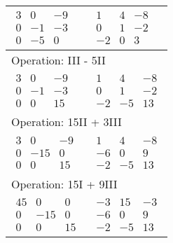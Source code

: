 \begin{longtable}{p{4cm}|p{3cm}}
    $\displaystyle\begin{matrix}
        3 & 0 & -9 \\
        0 & -1 & -3\\
        0 & -5 & 0
    \end{matrix}$&
    $\displaystyle\begin{matrix}
        1 & 4 & -8 \\
        0 & 1 & -2 \\
        -2 & 0 & 3
    \end{matrix}$\\\hline
    \multicolumn{2}{p{\dimexpr4cm+3cm+2\tabcolsep\relax}}{Operation: III - 5II} \\\hline\pagebreak[0]
    
    $\displaystyle\begin{matrix}
        3 & 0 & -9 \\
        0 & -1 & -3\\
        0 & 0 & 15
    \end{matrix}$&
    $\displaystyle\begin{matrix}
        1 & 4 & -8 \\
        0 & 1 & -2 \\
        -2 & -5 & 13
    \end{matrix}$\\\hline
    \multicolumn{2}{p{\dimexpr4cm+3cm+2\tabcolsep\relax}}{Operation: 15II + 3III} \\\hline\pagebreak[0]

    $\displaystyle\begin{matrix}
        3 & 0 & -9 \\
        0 & -15 & 0\\
        0 & 0 & 15
    \end{matrix}$&
    $\displaystyle\begin{matrix}
        1 & 4 & -8 \\
        -6 & 0 & 9 \\
        -2 & -5 & 13
    \end{matrix}$\\\hline

    \multicolumn{2}{p{\dimexpr4cm+3cm+2\tabcolsep\relax}}{Operation: 15I + 9III} \\\hline\pagebreak[0]
    $\displaystyle\begin{matrix}
        45 & 0 & 0 \\
        0 & -15 & 0\\
        0 & 0 & 15
    \end{matrix}$&
    $\displaystyle\begin{matrix}
        -3 & 15 & -3 \\
        -6 & 0 & 9 \\
        -2 & -5 & 13
    \end{matrix}$\\\hline


\end{longtable}

